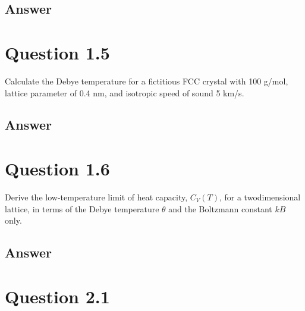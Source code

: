 \documentclass[
	12pt, %
]{fphw}
\begin{document}
\subsection*{Answer}




\section*{Question 1.5}

\begin{problem}
Calculate the Debye temperature for a fictitious FCC crystal with 100
g/mol, lattice parameter of 0.4 nm, and isotropic speed of sound 5
km/s.
\end{problem}


\subsection*{Answer} 




\section*{Question 1.6}

\begin{problem}
Derive the low-temperature limit of heat capacity, $C_V (T)$, for a twodimensional lattice, in terms of the Debye temperature $\theta$ and the Boltzmann constant $kB$ only.
\end{problem}


\subsection*{Answer}




\section*{Question 2.1}
\end{document}
